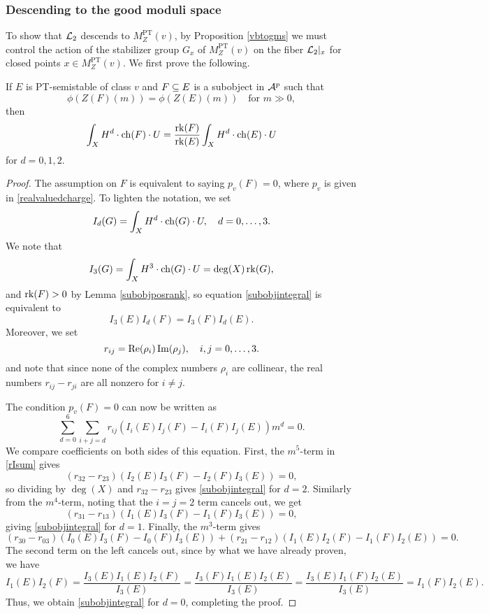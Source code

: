 \subsubsection{Descending to the good moduli space}
To show that $\mathcal{L}_2$ descends to $M^{\text{PT}}_Z(v)$, by Proposition \ref{vbtogms} we must control the action of the stabilizer group $G_x$ of $M^{\text{PT}}_Z(v)$ on the fiber $\mathcal{L}_2|_x$ for closed points $x \in M^{\text{PT}}_Z(v)$. We first prove the following.
\begin{lem}\label{subobjintlemma}
    If $E$ is PT-semistable of class $v$ and $F \subseteq E$ is a subobject in $\mathcal{A}^p$ such that 
    \[ \phi(Z(F)(m)) = \phi(Z(E)(m)) \quad \text{for } m \gg 0, \]
    then
    \begin{equation}\label{subobjintegral}
         \int_X H^d \cdot \operatorname{\mathrm{ch}}(F) \cdot U = \frac{\operatorname{\mathrm{rk}}(F)}{\operatorname{\mathrm{rk}}(E)} \int_X H^d\cdot \operatorname{\mathrm{ch}}(E) \cdot U
    \end{equation}
    for $d = 0, 1, 2$.
\end{lem}
\begin{proof}
    The assumption on $F$ is equivalent to saying $p_v(F) = 0$, where $p_v$ is given in \eqref{realvaluedcharge}. To lighten the notation, we set
    \[ I_d(G) = \int_X H^d \cdot \operatorname{\mathrm{ch}}(G) \cdot U, \quad d = 0, \ldots, 3. \]
    We note that
    \[ I_3(G) = \int_X H^3 \cdot \operatorname{\mathrm{ch}}(G) \cdot U = \deg(X) \operatorname{\mathrm{rk}}(G), \]
    and  $\operatorname{\mathrm{rk}}(F) > 0$ by Lemma \ref{subobjposrank}, so equation \eqref{subobjintegral} is equivalent to 
    \[ I_3(E) I_d(F) = I_3(F) I_d(E). \]
    Moreover, we set
    \[ r_{ij} = \operatorname{\mathrm{Re}}(\rho_i) \operatorname{\mathrm{Im}}(\rho_j), \quad i, j = 0, \ldots, 3. \]
    and note that since none of the complex numbers $\rho_i$ are collinear, the real numbers $r_{ij} - r_{ji}$ are all nonzero for $i \neq j$.
    
    The condition $p_v(F) = 0$ can now be written as
    \begin{equation}\label{rIsum}
        \sum_{d=0}^6 \sum_{i+j = d} r_{ij} ( I_i(E) I_j(F) - I_i(F) I_j(E)) m^d = 0.
    \end{equation}
    We compare coefficients on both sides of this equation. First, the $m^5$-term in \eqref{rIsum} gives
    \[ (r_{32}-r_{23})(I_2(E) I_3(F) - I_2(F) I_3(E)) = 0, \]
    so dividing by $\deg(X)$ and $r_{32}-r_{23}$ gives \eqref{subobjintegral} for $d = 2$. Similarly from the $m^4$-term, noting that the $i = j =2$ term cancels out, we get
    \[ (r_{31}-r_{13})(I_1(E) I_3(F) - I_1(F) I_3(E)) = 0, \]
    giving \eqref{subobjintegral} for $d = 1$. Finally, the $m^3$-term gives
    \[ (r_{30}-r_{03})(I_0(E) I_3(F) - I_0(F) I_3(E)) + (r_{21}-r_{12})(I_1(E) I_2(F) - I_1(F) I_2(E)) = 0. \]
    The second term on the left cancels out, since by what we have already proven, we have
    \[ I_1(E) I_2(F) = \frac{I_3(E) I_1(E) I_2(F)}{I_3(E)} = \frac{I_3(F) I_1(E) I_2(E)}{I_3(E)} = \frac{I_3(E) I_1(F) I_2(E)}{I_3(E)} = I_1(F) I_2(E). \]
    Thus, we obtain \eqref{subobjintegral} for $d = 0$, completing the proof.
\end{proof}

